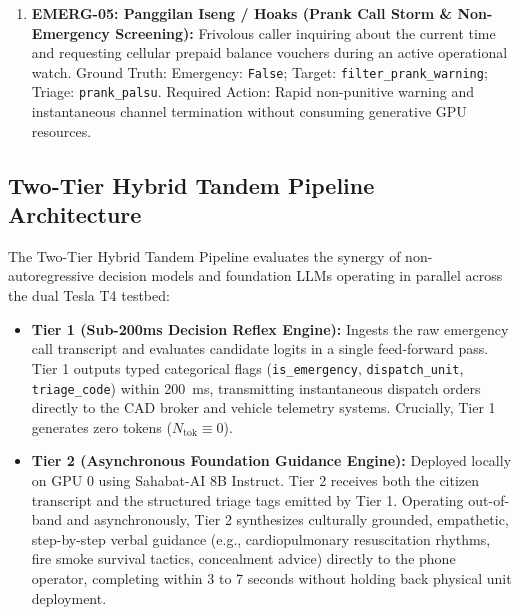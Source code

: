 \documentclass[journal,compsoc]{IEEEtran}
\begin{document}
\begin{enumerate}
    \item \textbf{EMERG-05: Panggilan Iseng / Hoaks (Prank Call Storm \& Non-Emergency Screening):} Frivolous caller inquiring about the current time and requesting cellular prepaid balance vouchers during an active operational watch. Ground Truth: Emergency: \texttt{False}; Target: \texttt{filter\_prank\_warning}; Triage: \texttt{prank\_palsu}. Required Action: Rapid non-punitive warning and instantaneous channel termination without consuming generative GPU resources.
\end{enumerate}

\subsection{Two-Tier Hybrid Tandem Pipeline Architecture}
The Two-Tier Hybrid Tandem Pipeline evaluates the synergy of non-autoregressive decision models and foundation LLMs operating in parallel across the dual Tesla T4 testbed:
\begin{itemize}
    \item \textbf{Tier 1 (Sub-200ms Decision Reflex Engine):} Ingests the raw emergency call transcript and evaluates candidate logits in a single feed-forward pass. Tier 1 outputs typed categorical flags (\texttt{is\_emergency}, \texttt{dispatch\_unit}, \texttt{triage\_code}) within 200~ms, transmitting instantaneous dispatch orders directly to the CAD broker and vehicle telemetry systems. Crucially, Tier 1 generates zero tokens ($N_{\text{tok}} \equiv 0$).
    \item \textbf{Tier 2 (Asynchronous Foundation Guidance Engine):} Deployed locally on GPU 0 using Sahabat-AI 8B Instruct. Tier 2 receives both the citizen transcript and the structured triage tags emitted by Tier 1. Operating out-of-band and asynchronously, Tier 2 synthesizes culturally grounded, empathetic, step-by-step verbal guidance (e.g., cardiopulmonary resuscitation rhythms, fire smoke survival tactics, concealment advice) directly to the phone operator, completing within 3 to 7 seconds without holding back physical unit deployment.
\end{itemize}
\end{document}
